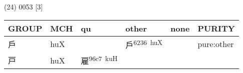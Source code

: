 \documentclass[14pt,a4paper]{scrartcl}
\begin{document}
(24) 0053 {[}3{]}

\begin{longtable}[c]{@{}llllll@{}}
\toprule
\begin{minipage}[b]{0.14\columnwidth}\raggedright\strut
GROUP
\strut\end{minipage} &
\begin{minipage}[b]{0.14\columnwidth}\raggedright\strut
MCH
\strut\end{minipage} &
\begin{minipage}[b]{0.14\columnwidth}\raggedright\strut
qu
\strut\end{minipage} &
\begin{minipage}[b]{0.14\columnwidth}\raggedright\strut
other
\strut\end{minipage} &
\begin{minipage}[b]{0.14\columnwidth}\raggedright\strut
none
\strut\end{minipage} &
\begin{minipage}[b]{0.14\columnwidth}\raggedright\strut
PURITY
\strut\end{minipage}\tabularnewline
\midrule
\endhead
\begin{minipage}[t]{0.14\columnwidth}\raggedright\strut
戶
\strut\end{minipage} &
\begin{minipage}[t]{0.14\columnwidth}\raggedright\strut
huX
\strut\end{minipage} &
\begin{minipage}[t]{0.14\columnwidth}\raggedright\strut
\strut\end{minipage} &
\begin{minipage}[t]{0.14\columnwidth}\raggedright\strut
戶\textsuperscript{6236~huX}
\strut\end{minipage} &
\begin{minipage}[t]{0.14\columnwidth}\raggedright\strut
\strut\end{minipage} &
\begin{minipage}[t]{0.14\columnwidth}\raggedright\strut
pure:other
\strut\end{minipage}\tabularnewline
\begin{minipage}[t]{0.14\columnwidth}\raggedright\strut
戸
\strut\end{minipage} &
\begin{minipage}[t]{0.14\columnwidth}\raggedright\strut
huX
\strut\end{minipage} &
\begin{minipage}[t]{0.14\columnwidth}\raggedright\strut
雇\textsuperscript{96c7~kuH}

\end{minipage}
\end{longtable}
\end{document}
